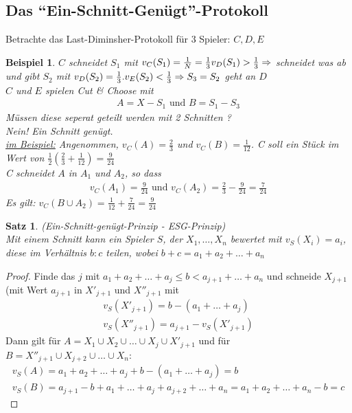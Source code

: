 \documentclass[a4paper,10pt]{scrartcl}
\newtheorem*{beispiel}{Beispiel}
\newtheorem*{satz}{Satz}
\begin{document}
\subsection{Das ``Ein-Schnitt-Genügt''-Protokoll}
Betrachte das Last-Diminsher-Protokoll für 3 Spieler: $C,D,E$
\begin{beispiel}
 $C$ schneidet $S_1$ mit $v_C(S_1)=\frac{1}{N}=\frac{1}{3}\\v_D(S_1)>\frac{1}{3}\Rightarrow$ schneidet was ab und gibt 
 $S_2$ mit $v_D(S_2)=\frac{1}{3}.\\v_E(S_2)<\frac{1}{3}\Rightarrow S_3=S_2$ geht an $D$\\
 $C$ und $E$ spielen Cut \& Choose mit\begin{align}
                                       A = X-S_1\text{ und } B=S_1-S_3
                                      \end{align}
 Müssen diese seperat geteilt werden mit 2 Schnitten ?\\
 Nein! Ein Schnitt genügt.\\
 \underline{im Beispiel:} Angenommen, $v_C(A)=\frac{2}{3}$ und $v_C(B)=\frac{1}{12}$. C soll ein Stück im Wert von 
                          $\frac{1}{2}(\frac{2}{3}+\frac{1}{12})=\frac{9}{24}$\\
 C schneidet $A$ in $A_1$ und $A_2$, so dass \begin{align}
                                              v_C(A_1)=\frac{9}{24}\text{ und }v_C(A_2)=\frac{2}{3}-\frac{9}{24}=\frac{7}{24}
                                             \end{align}
 Es gilt: $v_C(B\cup A_2)=\frac{1}{12}+\frac{7}{24}=\frac{9}{24}$
\end{beispiel}
\begin{satz}
 (Ein-Schnitt-genügt-Prinzip - ESG-Prinzip)\\
Mit einem Schnitt kann ein Spieler $S$, der $X_1,\dots,X_n$ bewertet mit $v_S(X_i)=a_i$, diese im Verhältnis $b:c$ teilen, wobei 
$b+c=a_1+a_2+\dots+a_n$
\end{satz}
\begin{proof}
 Finde das $j$ mit $a_1+a_2+\dots+a_j\leq b<a_{j+1}+\dots+a_n$ und schneide $X_{j+1}$(mit Wert $a_{j+1}$ in $X'_{j+1}$ und $X''_{j+1}$
 mit \begin{align*}
      v_S(X'_{j+1})=b-(a_1+\dots+a_j)\\
      v_S(X''_{j+1})=a_{j+1}-v_S(X'_{j+1})
     \end{align*}
 Dann gilt für $A=X_1\cup X_2\cup\dots\cup X_j\cup X'_{j+1}$ und für $B=X''_{j+1}\cup X_{j+2}\cup\dots\cup  X_n$:
 \begin{align*}
  v_S(A)=a_1+a_2+\dots+a_j+b-(a_1+\dots+a_j)=b\\
  v_S(B)=a_{j+1}-b+a_1+\dots+a_j+a_{j+2}+\dots+a_n=a_1+a_2+\dots+a_n-b=c
 \end{align*}
\end{proof}
\end{document}
